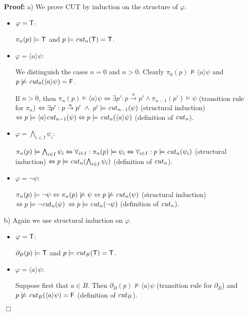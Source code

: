 \documentclass{eptcs}
\def\enc{\partial}
\def\transa{\stackrel{a}{\rightarrow}}
\def\transa{\stackrel{a}{\rightarrow}}
\def\iff{\Leftrightarrow}
\def\true{{\sf T}}
\def\false{{\sf F}}
\newenvironment{proof}{\begin{trivlist} \item[\hspace{\labelsep}\bf Proof:]}{\hfill $\Box$ \end{trivlist}}
\def\foralli{\forall_{i \in I}}
\newcommand{\diam}[1]{\langle#1\rangle}
\begin{document}
\begin{proof}
a) We prove CUT by induction on the structure of $\varphi$.
\begin{itemize}
\item $\varphi = \true$:

$\pi_n(p) \models \true$  and $p\models {\it cut}_n(\true)=\true$.

\item $\varphi = \diam{a} \psi$:

We distinguish the cases $n=0$ and $n > 0$.
Clearly $\pi_0(p) \not\models \diam{a} \psi$ and $p\not\models {\it cut}_0(\diam{a} \psi)=\false$.

If $ n > 0$, then $\pi_{n}(p) \models \diam{a} \psi
\iff \exists p': p \transa p' \wedge \pi_{n-1}(p') \models \psi$ (transition rule for $\pi_n$)
$\iff \exists p': p \transa p' ~\wedge~ p' \models {\it cut}_{n-1}(\psi)$ (structural induction)
$\iff p \models \diam{a}{\it cut}_{n-1}(\psi)
\iff p \models {\it cut}_{n}(\diam{a} \psi)$ (definition of ${\it cut}_n$).

\item $\varphi = \bigwedge_{i \in I} \psi_i$:

$\pi_n(p) \models \bigwedge_{i \in I} \psi_i
\iff \foralli: \pi_n(p) \models \psi_i
\iff \foralli: p \models {\it cut}_n(\psi_i)$ (structural induction)
$\iff p \models {\it cut}_n(\bigwedge_{i \in I} \psi_i)$ (definition of ${\it cut}_n$).

\item $\varphi = \neg \psi$:

$\pi_n(p) \models \neg \psi
\iff \pi_n(p) \not \models \psi
\iff p \not \models {\it cut}_n(\psi)$ (structural induction)
$\iff p \models \neg {\it cut}_n(\psi)$ $\iff p \models {\it cut}_n(\neg \psi)$ (definition of ${\it cut}_n$).
\end{itemize}



b) Again we use structural induction on $\varphi$.
\begin{itemize}
\item $\varphi = \true$:

$\enc_B(p) \models \true$  and $p \models {\it cut}_B(\true)=\true$.

\item $\varphi = \diam{a} \psi$:

Suppose first that $a  \in B$. Then $\enc_B(p) \not \models \diam{a} \psi$ (transition rule for $\enc_B$)
and $p \not \models {\it cut}_B(\diam{a} \psi)=\false$ (definition of ${\it cut}_B$).


\end{itemize}
\end{proof}
\end{document}
